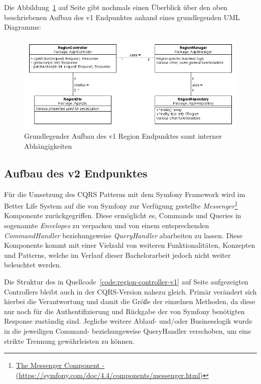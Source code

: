 \documentclass[a4paper,12pt,twoside]{scrreprt}
\begin{document}
\medskip

Die Abbildung~\ref{fig:region-v1-uml} auf Seite \pageref{fig:region-v1-uml} gibt nochmals einen Überblick über den oben beschriebenen Aufbau des v1 Endpunktes anhand eines grundlegenden UML Diagramms:

\begin{figure}[ht]
    \centering
    \includegraphics[scale=0.48]{images/region-v1-uml.png}
    \caption[UML Diagramm des v1 Region Endpunktes]{Grundlegender Aufbau des v1 Region Endpunktes samt interner Abhängigkeiten}
    \label{fig:region-v1-uml}
\end{figure}

\subsection{Aufbau des v2 Endpunktes}
\label{sub-sec:region-aufbau-v2}
Für die Umsetzung des CQRS Patterns mit dem Symfony Framework wird im Better Life System auf die von Symfony zur Verfügung gestellte \textit{Messenger}\footnote{\href{https://symfony.com/doc/4.4/components/messenger.html}{The Messenger Component - (https://symfony.com/doc/4.4/components/messenger.html)}} Komponente zurückgegriffen. Diese ermöglicht es, Commands und Queries in sogenannte \textit{Envelopes} zu verpacken und von einem entsprechenden \textit{CommandHandler} beziehungsweise \textit{QueryHandler} abarbeiten zu lassen. Diese Komponente kommt mit einer Vielzahl von weiteren Funktionalitäten, Konzepten und Patterns, welche im Verlauf dieser Bachelorarbeit jedoch nicht weiter beleuchtet werden.

Die Struktur des in Quellcode~\ref{code:region-controller-v1} auf Seite \pageref{code:region-controller-v1} aufgezeigten Controllers bleibt auch in der CQRS-Version nahezu gleich. Primär verändert sich hierbei die Verantwortung und damit die Größe der einzelnen Methoden, da diese nur noch für die Authentifizierung und Rückgabe der von Symfony benötigten Response zuständig sind. Jegliche weitere Ablauf- und/oder Businesslogik wurde in die jeweiligen Command- beziehungsweise QueryHandler verschoben, um eine strikte Trennung gewährleisten zu können.
\end{document}
